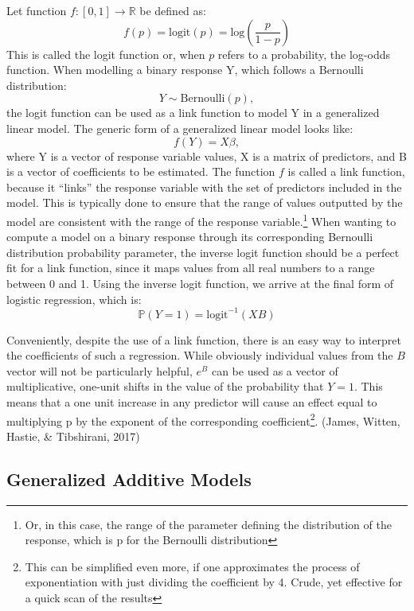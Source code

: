 \documentclass[12pt,twoside]{reedthesis}
\begin{document}
  Let function \(f : [0, 1] \to \mathbb{R}\) be defined as:
  \[f(p) = \text{logit}(p) = \text{log}\left( \frac{p}{1-p} \right)\] This
  is called the logit function or, when \(p\) refers to a probability, the
  log-odds function. When modelling a binary response Y, which follows a
  Bernoulli distribution: \[Y \sim \text{Bernoulli}(p),\] the logit
  function can be used as a link function to model Y in a generalized
  linear model. The generic form of a generalized linear model looks
  like:\\
  \[f(Y) = X\beta ,\] where Y is a vector of response variable values, X
  is a matrix of predictors, and B is a vector of coefficients to be
  estimated. The function \(f\) is called a link function, because it
  ``links'' the response variable with the set of predictors included in
  the model. This is typically done to ensure that the range of values
  outputted by the model are consistent with the range of the response
  variable.\footnote{Or, in this case, the range of the parameter defining
    the distribution of the response, which is p for the Bernoulli
    distribution} When wanting to compute a model on a binary response
  through its corresponding Bernoulli distribution probability parameter,
  the inverse logit function should be a perfect fit for a link function,
  since it maps values from all real numbers to a range between 0 and 1.
  Using the inverse logit function, we arrive at the final form of
  logistic regression, which is:\\
  \[\mathbb{P} (Y = 1) = \text{logit}^{-1} (XB)\]
  
  Conveniently, despite the use of a link function, there is an easy way
  to interpret the coefficients of such a regression. While obviously
  individual values from the \(B\) vector will not be particularly
  helpful, \(e^B\) can be used as a vector of multiplicative, one-unit
  shifts in the value of the probability that \(Y = 1\). This means that a
  one unit increase in any predictor will cause an effect equal to
  multiplying p by the exponent of the corresponding coefficient\footnote{This
    can be simplified even more, if one approximates the process of
    exponentiation with just dividing the coefficient by 4. Crude, yet
    effective for a quick scan of the results}. (James, Witten, Hastie, \&
  Tibshirani, 2017)
  
  \subsection{Generalized Additive
  Models}\label{generalized-additive-models}
  
\end{document}
